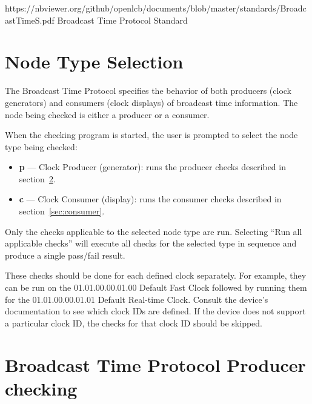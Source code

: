 



\maketitle
\thispagestyle{firststyle}

\introductionCaveats
    {https://nbviewer.org/github/openlcb/documents/blob/master/standards/BroadcastTimeS.pdf}
    {Broadcast Time Protocol Standard}

\section{Node Type Selection}

The Broadcast Time Protocol specifies the behavior of both producers (clock generators)
and consumers (clock displays) of broadcast time information.
The node being checked is either a producer or a consumer.

When the checking program is started, the user is prompted to select the node type
being checked:
\begin{itemize}
\item \textbf{p} --- Clock Producer (generator): runs the producer checks described in section~\ref{sec:producer}.
\item \textbf{c} --- Clock Consumer (display): runs the consumer checks described in section~\ref{sec:consumer}.
\end{itemize}

Only the checks applicable to the selected node type are run.
Selecting ``Run all applicable checks'' will execute all checks for the selected type
in sequence and produce a single pass/fail result.

These checks should be done for each defined clock separately.
For example, they can be run on the 01.01.00.00.01.00 Default Fast Clock
followed by running them for the 01.01.00.00.01.01 Default Real-time Clock.
Consult the device's documentation to see which clock IDs are defined.
If the device does not support a particular clock ID, the checks for that clock ID
should be skipped.

\section{Broadcast Time Protocol Producer checking}
\label{sec:producer}


